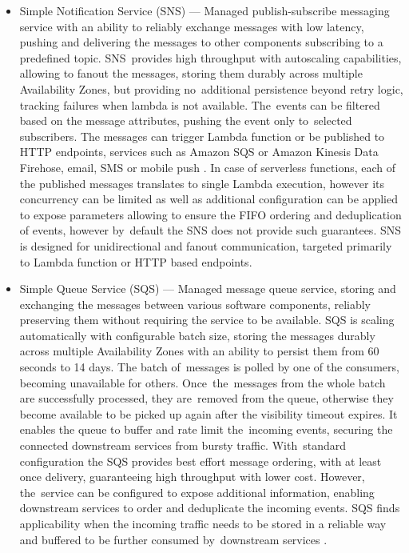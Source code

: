 \begin{itemize}
   \item Simple Notification Service (SNS) ---
   Managed publish-subscribe messaging service with an ability to reliably exchange messages with low latency, pushing and delivering the messages to other components subscribing to a predefined topic.
   SNS~provides high throughput with autoscaling capabilities, allowing to fanout the messages, storing them durably across multiple Availability Zones, but providing no~additional persistence beyond retry logic, tracking failures when lambda is not available.
   The~events can be filtered based on the message attributes, pushing the event only to~selected subscribers.   
   The messages can trigger Lambda function or be published to HTTP endpoints, services such as Amazon SQS or Amazon Kinesis Data Firehose, email, SMS or mobile push \cite{ChoosingEventsQueuesTopicsAndStreamsInYourServerlessApplication}.
   In case of serverless functions, each of the published messages translates to single Lambda execution, however its concurrency can be limited as well as additional configuration can be applied to expose parameters allowing to ensure the FIFO ordering and deduplication of events, however by~default the SNS does not provide such guarantees.
   SNS is designed for unidirectional and fanout communication, targeted primarily to Lambda function or HTTP based endpoints.

   \item Simple Queue Service (SQS) ---
   Managed message queue service, storing and exchanging the messages between various software components, reliably preserving them without requiring the service to be available.
   SQS is scaling automatically with configurable batch size, storing the messages durably across multiple Availability Zones with an ability to persist them from 60 seconds to 14 days.
   The batch of~messages is polled by one of the consumers, becoming unavailable for others. Once~the~messages from the whole batch are successfully processed, they are~removed from the queue, otherwise they become available to be picked up again after the visibility timeout expires.
   It enables the queue to buffer and rate limit the~incoming events, securing the connected downstream services from bursty traffic.
   With~standard configuration the SQS provides best effort message ordering, with at least once delivery, guaranteeing high throughput with lower cost. However, the~service can be configured to expose additional information, enabling downstream services to order and deduplicate the incoming events.
   SQS finds applicability when the incoming traffic needs to be stored in a reliable way and buffered to be further consumed by~downstream services \cite{AWSReinventScalableServerlessEventDrivenArchitecturesWithSNSSQSLambda}.


\end{itemize}
